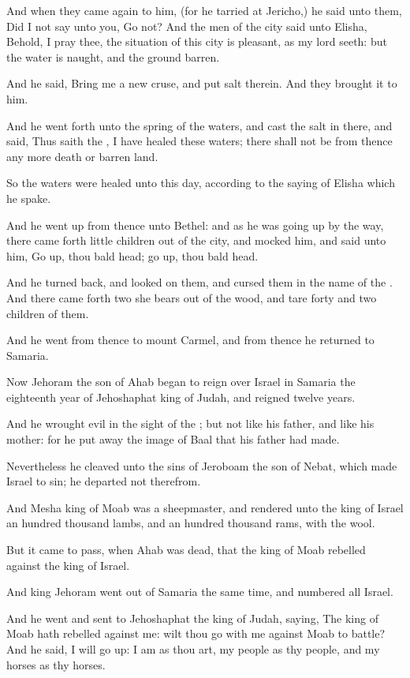 \Verse And when they came again to him, (for he tarried at Jericho,) he said unto them, Did I not say unto you, Go not?  \Verse And the men of the city said unto Elisha, Behold, I pray thee, the situation of this city is pleasant, as my lord seeth: but the water is naught, and the ground barren.

\Verse And he said, Bring me a new cruse, and put salt therein. And they brought it to him.

\Verse And he went forth unto the spring of the waters, and cast the salt in there, and said, Thus saith the \LORD, I have healed these waters; there shall not be from thence any more death or barren land.

\Verse So the waters were healed unto this day, according to the saying of Elisha which he spake.

\Verse And he went up from thence unto Bethel: and as he was going up by the way, there came forth little children out of the city, and mocked him, and said unto him, Go up, thou bald head; go up, thou bald head.

\Verse And he turned back, and looked on them, and cursed them in the name of the \LORD. And there came forth two she bears out of the wood, and tare forty and two children of them.

\Verse And he went from thence to mount Carmel, and from thence he returned to Samaria.


\Chapter
\Verse Now Jehoram the son of Ahab began to reign over Israel in Samaria the eighteenth year of Jehoshaphat king of Judah, and reigned twelve years.

\Verse And he wrought evil in the sight of the \LORD; but not like his father, and like his mother: for he put away the image of Baal that his father had made.

\Verse Nevertheless he cleaved unto the sins of Jeroboam the son of Nebat, which made Israel to sin; he departed not therefrom.

\Verse And Mesha king of Moab was a sheepmaster, and rendered unto the king of Israel an hundred thousand lambs, and an hundred thousand rams, with the wool.

\Verse But it came to pass, when Ahab was dead, that the king of Moab rebelled against the king of Israel.

\Verse And king Jehoram went out of Samaria the same time, and numbered all Israel.

\Verse And he went and sent to Jehoshaphat the king of Judah, saying, The king of Moab hath rebelled against me: wilt thou go with me against Moab to battle? And he said, I will go up: I am as thou art, my people as thy people, and my horses as thy horses.

